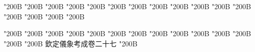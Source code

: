 \begin{正文}
\char"200B\relax{}
\char"200B\relax{}
\char"200B\relax{}
\char"200B\relax{}
\char"200B\relax{}
\char"200B\relax{}
\char"200B\relax{}
\char"200B\relax{}
\char"200B\relax{}
\char"200B\relax{}
\char"200B\relax{}
\char"200B\relax{}
\char"200B\relax{}
\char"200B\relax{}
\char"200B\relax{}
\char"200B\relax
{}\par
\end{正文}\clearpage
{}
\begin{正文}
\char"200B\relax{}
\char"200B\relax{}
\char"200B\relax{}
\char"200B\relax{}
\char"200B\relax{}
\char"200B\relax{}
\char"200B\relax{}
\char"200B\relax{}
\char"200B\relax{}
\char"200B\relax{}
\char"200B\relax{}
\char"200B\relax{}
\char"200B\relax{}
\char"200B\relax{}
欽定儀象考成卷二十七
\char"200B\relax
\par

\par\end{正文}\clearpage
